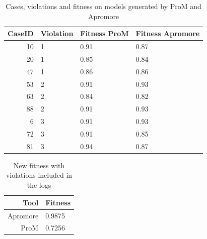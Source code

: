 \begin{table}[H]
\centering
\begin{tabular}{|r|l|l|l|}
\hline
\textbf{CaseID} & \textbf{Violation} & \textbf{Fitness ProM} & \textbf{Fitness Apromore} \\
\hline
10 & 1 & 0.91 & 0.87 \\
\hline
20 & 1 & 0.85 & 0.84 \\
\hline
47 & 1 & 0.86 & 0.86 \\
\hline
53 & 2 & 0.91 & 0.93 \\
\hline
63 & 2 & 0.84 & 0.82 \\
\hline
88 & 2 & 0.91 & 0.93 \\
\hline
6 & 3 & 0.91 & 0.93 \\
\hline
72 & 3 & 0.91 & 0.85 \\
\hline
81 & 3 & 0.94 & 0.87 \\
\hline
\end{tabular}
\caption{Cases, violations and fitness on models generated by ProM and Apromore}
\label{tab:violations}
\end{table}

\begin{table}[H]
\centering
\begin{tabular}{|r|l|}
\hline
\textbf{Tool} & \textbf{Fitness} \\
\hline
Apromore & 0.9875 \\
\hline
ProM & 0.7256 \\
\hline
\end{tabular}
\caption{New fitness with violations included in the logs}
\label{tab:violations_fitness}
\end{table}

